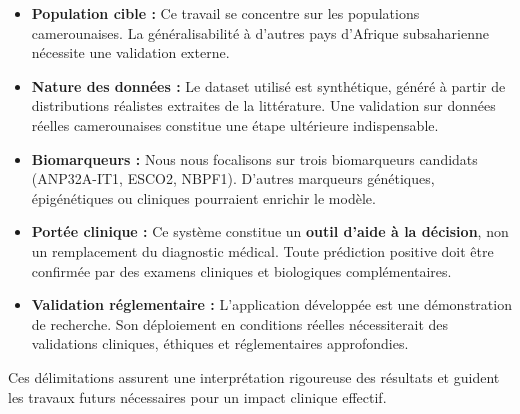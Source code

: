 \begin{itemize}
    \item \textbf{Population cible :} Ce travail se concentre sur les populations camerounaises. La généralisabilité à d'autres pays d'Afrique subsaharienne nécessite une validation externe.

    \item \textbf{Nature des données :} Le dataset utilisé est synthétique, généré à partir de distributions réalistes extraites de la littérature. Une validation sur données réelles camerounaises constitue une étape ultérieure indispensable.

    \item \textbf{Biomarqueurs :} Nous nous focalisons sur trois biomarqueurs candidats (ANP32A-IT1, ESCO2, NBPF1). D'autres marqueurs génétiques, épigénétiques ou cliniques pourraient enrichir le modèle.

    \item \textbf{Portée clinique :} Ce système constitue un \textbf{outil d'aide à la décision}, non un remplacement du diagnostic médical. Toute prédiction positive doit être confirmée par des examens cliniques et biologiques complémentaires.

    \item \textbf{Validation réglementaire :} L'application développée est une démonstration de recherche. Son déploiement en conditions réelles nécessiterait des validations cliniques, éthiques et réglementaires approfondies.
\end{itemize}

Ces délimitations assurent une interprétation rigoureuse des résultats et guident les travaux futurs nécessaires pour un impact clinique effectif.
